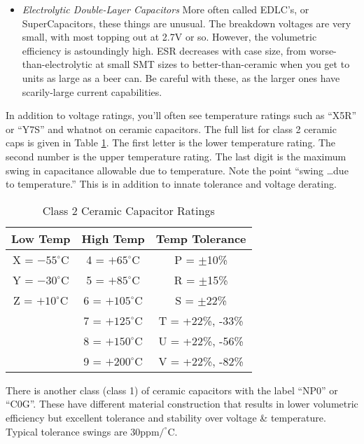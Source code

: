 \begin{itemize}
\item \emph{Electrolytic Double-Layer Capacitors} More often called EDLC's, or SuperCapacitors, these things are unusual. The breakdown voltages are very small, with most topping out at 2.7V or so. However, the volumetric efficiency is astoundingly high. ESR decreases with case size, from worse-than-electrolytic at small SMT sizes to better-than-ceramic when you get to units as large as a beer can. Be careful with these, as the larger ones have scarily-large current capabilities.
\end{itemize}



In addition to voltage ratings, you'll often see temperature ratings such as ``X5R'' or ``Y7S'' and whatnot on ceramic capacitors. The full list for class 2 ceramic caps is given in Table \ref{class2_cer_ratings}. The first letter is the lower temperature rating. The second number is the upper temperature rating. The last digit is the maximum swing in capacitance allowable due to temperature. Note the point ``swing \ldots due to temperature.'' This is in addition to innate tolerance and voltage derating.

\begin{table}[h]
\centering
\begin{tabular}{c|c|c}
Low Temp & High Temp & Temp Tolerance \\
\hline
X = $-55^{\circ}$C & 4 = $+65^{\circ}$C & P = $\pm$10\% \\
Y = $-30^{\circ}$C & 5 = $+85^{\circ}$C & R = $\pm$15\% \\
Z = $+10^{\circ}$C & 6 = $+105^{\circ}$C & S = $\pm$22\% \\
~ & 7 = $+125^{\circ}$C & T = +22\%, -33\% \\
~ & 8 = $+150^{\circ}$C & U = +22\%, -56\% \\
~ & 9 = $+200^{\circ}$C & V = +22\%, -82\% \\
\end{tabular}
\caption{Class 2 Ceramic Capacitor Ratings}\label{class2_cer_ratings}
\end{table}

There is another class (class 1) of ceramic capacitors with the label ``NP0'' or ``C0G''. These have different material construction that results in lower volumetric efficiency but excellent tolerance and stability over voltage \& temperature. Typical tolerance swings are 30ppm$/^{\circ}$C.